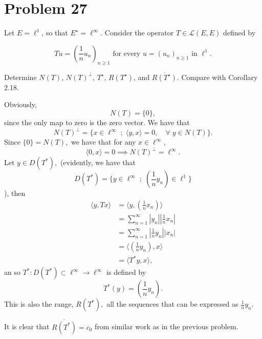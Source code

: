 \documentclass[11pt]{article}
\begin{document}
\section*{Problem 27}
\begin{problem}
    Let \( E = \ell^1 \), so that \( E^\star = \ell^\infty \). Consider the operator \( T \in \mathcal{L}(E, E) \) defined by



\[ Tu = \left( \frac{1}{n} u_n \right)_{n \geq 1} \text{ for every } u = (u_n)_{n \geq 1} \text{ in } \ell^1. \]



Determine \( N(T) \), \( N(T)^\perp \), \( T^\star \), \( R(T^\star) \), and \( \overline{R(T^\star)} \). Compare with Corollary 2.18.
\end{problem}
\begin{solution}
Obviously, 
\[N(T) = \{0\},\] since the only map to zero is the zero vector. We have that 
\[N(T)^\perp = \{x \in \ell^\infty \; ; \;  \langle y, x\rangle = 0, \quad \forall \; y \in N(T)\}.\] Since $\{0\} = N(T),$ we have that for any $x\in \ell^\infty,$ 
\[\langle 0, x\rangle = 0 \implies N(T)^\perp = \ell^\infty.\]
Let $y\in D(T^*),$ (evidently, we have that 
\[D(T^*) = \{y \in \ell^\infty \;  ; \; (\frac{1}{n}y_n)\in \ell^1\}\]), then 
\begin{align*}
    \langle y, Tx \rangle &=  \langle y, (\frac{1}{n}x_n)\rangle\\
    &= \sum_{n=1}^\infty |y_n||\frac{1}{n}x_n|\\
    &= \sum_{n=1}^\infty |\frac{1}{n}y_n||x_n|\\
    &= \langle (\frac{1}{n}y_n), x\rangle\\
    &= \langle T^*y, x\rangle,
\end{align*}
an so $T^*: D(T^*)\subset \ell^\infty \to \ell^\infty$ is defined by 
\[T^*(y)= (\frac{1}{n}y_n).\] This is also the range, $R(T^*),$ all the sequences that can be expressed as $\frac{1}{n}y_n.$ 

It is clear that $\overline{R(T^*)} = c_0$ from similar work as in the previous problem. 
\end{solution}
\end{document}
